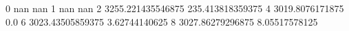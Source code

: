 0 nan nan
1 nan nan
2 3255.221435546875 235.413818359375
4 3019.8076171875 0.0
6 3023.43505859375 3.62744140625
8 3027.86279296875 8.05517578125

